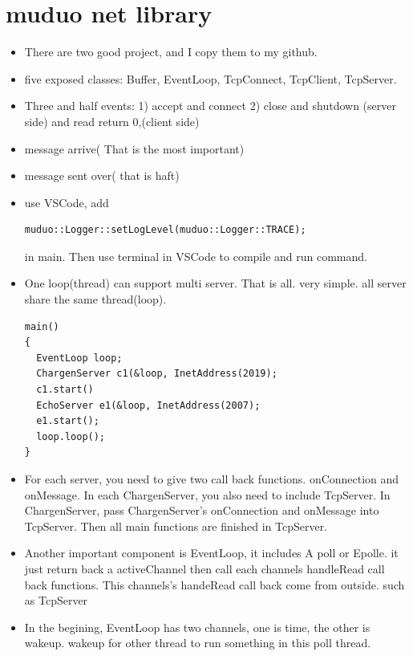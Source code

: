 \documentclass[paper=8.5in:11in, twoside, 12pt, pagesize=pdftex]{book}
\begin{document}
\chapter{muduo net library}
\begin{itemize}
	
	\item There are two good project, and I copy them to my github. 	
	
    \item five exposed classes: Buffer, EventLoop, TcpConnect, TcpClient, TcpServer.
    \item Three and half events: 1) accept and connect 2) close and shutdown (server side) and read return 0,(client side)
    \item message arrive( That is the most important) 
    \item message sent over( that is haft)

    \item use VSCode, add 
\begin{lstlisting}[]
muduo::Logger::setLogLevel(muduo::Logger::TRACE); 
\end{lstlisting}
in main. Then use terminal in VSCode to compile and run command. 

    \item One loop(thread) can support multi server.  That is all. very simple. all server share the same thread(loop).
\begin{lstlisting}[]
main()
{
  EventLoop loop;
  ChargenServer c1(&loop, InetAddress(2019);
  c1.start()
  EchoServer e1(&loop, InetAddress(2007);
  e1.start();
  loop.loop();
}
\end{lstlisting}
\item For each server, you need to give two call back functions. 
onConnection and onMessage. In each ChargenServer, you also need to include TcpServer.  In ChargenServer, pass ChargenServer's onConnection and onMessage into TcpServer. Then all main functions are finished in TcpServer. 

\item Another important component is EventLoop, it includes A poll or Epolle. it just return back a activeChannel then call each channels handleRead call back functions.  This channels's handeRead call back come from outside. such as TcpServer


\item In the begining, EventLoop has two channels, one is time, the other is wakeup.  wakeup for other thread to run something in this poll thread. 


\end{itemize}
\end{document}
